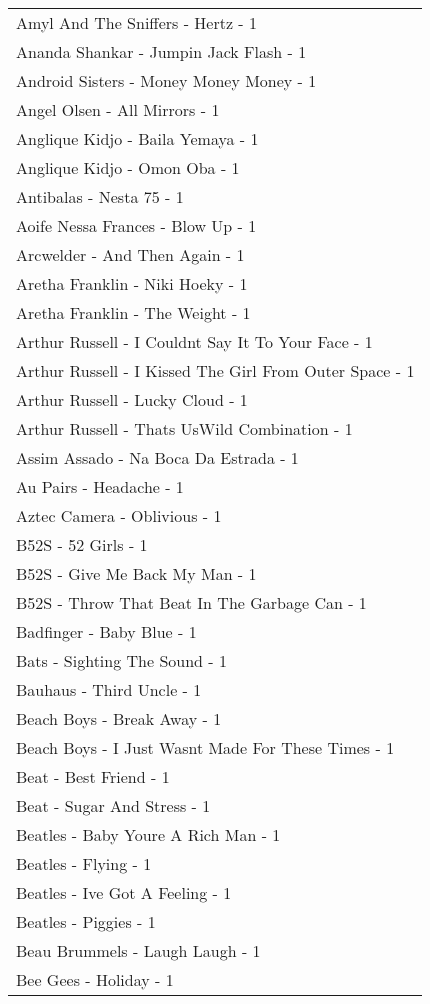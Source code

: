 \documentclass[
]{article}
\begin{document}
\begin{longtable}{l}
Amyl And The Sniffers - Hertz - 1 \\ 
Ananda Shankar - Jumpin Jack Flash - 1 \\ 
Android Sisters - Money Money Money - 1 \\ 
Angel Olsen - All Mirrors - 1 \\ 
Anglique Kidjo - Baila Yemaya - 1 \\ 
Anglique Kidjo - Omon Oba - 1 \\ 
Antibalas - Nesta 75 - 1 \\ 
Aoife Nessa Frances - Blow Up - 1 \\ 
Arcwelder - And Then Again - 1 \\ 
Aretha Franklin - Niki Hoeky - 1 \\ 
Aretha Franklin - The Weight - 1 \\ 
Arthur Russell - I Couldnt Say It To Your Face - 1 \\ 
Arthur Russell - I Kissed The Girl From Outer Space - 1 \\ 
Arthur Russell - Lucky Cloud - 1 \\ 
Arthur Russell - Thats UsWild Combination - 1 \\ 
Assim Assado - Na Boca Da Estrada - 1 \\ 
Au Pairs - Headache - 1 \\ 
Aztec Camera - Oblivious - 1 \\ 
B52S - 52 Girls - 1 \\ 
B52S - Give Me Back My Man - 1 \\ 
B52S - Throw That Beat In The Garbage Can - 1 \\ 
Badfinger - Baby Blue - 1 \\ 
Bats - Sighting The Sound - 1 \\ 
Bauhaus - Third Uncle - 1 \\ 
Beach Boys - Break Away - 1 \\ 
Beach Boys - I Just Wasnt Made For These Times - 1 \\ 
Beat - Best Friend - 1 \\ 
Beat - Sugar And Stress - 1 \\ 
Beatles - Baby Youre A Rich Man - 1 \\ 
Beatles - Flying - 1 \\ 
Beatles - Ive Got A Feeling - 1 \\ 
Beatles - Piggies - 1 \\ 
Beau Brummels - Laugh Laugh - 1 \\ 
Bee Gees - Holiday - 1 \\ 

\end{longtable}
\end{document}
